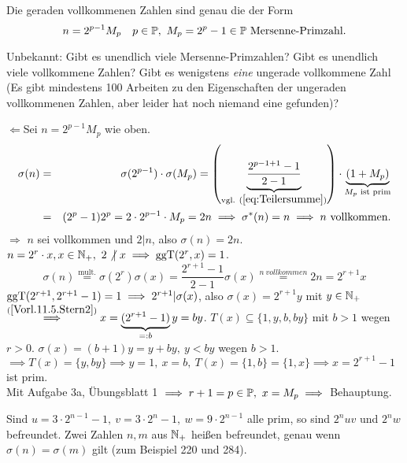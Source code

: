 \documentclass[a4paper,DIV15,BCOR12mm]{article}
\begin{document}
\begin{satz}
    Die geraden vollkommenen Zahlen sind genau die der Form
    $$
    n=2^{p-1} M_p\quad p\in \mathbb{P},\ M_p=2^p-1 \in \mathbb{P} \text{
    Mersenne-Primzahl}.
    $$
\end{satz}
Unbekannt: Gibt es unendlich viele Mersenne-Primzahlen? Gibt es
unendlich viele vollkommene Zahlen? Gibt es wenigstens \emph{eine}
ungerade vollkommene Zahl (Es gibt mindestens 100 Arbeiten zu den
Eigenschaften der ungeraden vollkommenen Zahlen, aber leider hat
noch niemand eine gefunden)?
\begin{beweis}\glqq $\Leftarrow$\grqq\space Sei $n=2^{p-1}M_p$ wie oben.
    \begin{eqnarray*}
        \sigma(n)&=&\sigma(2^{p-1}) \cdot
        \sigma(M_p)=\left(\underbrace{\frac{2^{p-1+1}-1}{2-1}}_{\text{vgl. }(\ref{eq:Teilersumme})}\right) \cdot \underbrace{(1+M_p)}_{M_p\text{ ist prim}}\\
        &=& (2^p-1)2^p=2\cdot 2^{p-1} \cdot M_p = 2n \implies \sigma^*(n)=n \implies n \text{
        vollkommen.}
    \end{eqnarray*}
    \glqq $\Rightarrow$
    \grqq\space $n$ sei vollkommen und $2|n$, also
    $\sigma(n)=2n$. $n=2^r \cdot x, x \in \mathbb{N}_+,\ 2 \not|\ x \implies
    \mathop{\rm ggT}\nolimits(2^r,x)=1$.
    \begin{equation}\label{Vorl.11.5.Stern2}
        \sigma(n)\stackrel{\text{mult.}}{=}\sigma(2^r)\sigma(x)=\frac{2^{r+1}-1}{2-1}\sigma(x)
        \stackrel{n \ vollkommen}{=}2n=2^{r+1}x
    \end{equation}
    $\mathop{\rm ggT}\nolimits(2^{r+1},2^{r+1}-1)=1 \implies 2^{r+1}|\sigma(x)$, also
    $\sigma(x)=2^{r+1}y$ mit $y\in \mathbb{N}_+$\\$
    \stackrel{(\ref{Vorl.11.5.Stern2})}{\implies} x=\underbrace{(2^{r+1}-1)}_{=:b}y
    =by$. $T(x) \subseteq \{1,y,b,by\}$ mit $b>1$ wegen $r>0$.
    $\sigma(x)=(b+1)y=y+by,\ y<by$ wegen $b>1$.\\
    $\implies T(x)=\{y,by\}\implies y=1,\ x=b,\ T(x)=\{1,b\}=\{1,x\}
    \implies x=2^{r+1}-1$ ist prim.\\
    Mit Aufgabe 3a, Übungsblatt 1 $\implies r+1=p \in \mathbb{P},\ x=M_p\implies$ Behauptung.
\end{beweis}
\begin{satz}
Sind $u=3\cdot 2^{n-1}-1,\ v=3\cdot 2^n -1,\ w=9\cdot 2^{n-1}$ alle
prim, so sind $2^n uv$ und $2^n w$ befreundet. Zwei Zahlen $n,m$ aus
$\mathbb{N}_+$ heißen befreundet, genau wenn $\sigma(n)=\sigma(m)$ gilt (zum Beispiel 220 und 284).
\end{satz}
\end{document}
